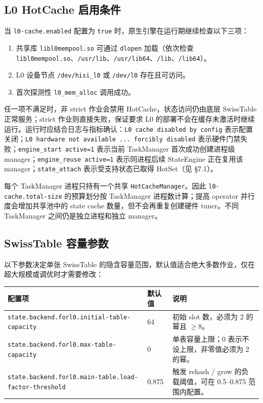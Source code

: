 \documentclass[a4paper,11pt]{article}
\newcommand{\cfg}[1]{\nolinkurl{#1}}
\begin{document}
\subsection{L0 HotCache 启用条件}

当 \texttt{l0-cache.enabled} 配置为 \texttt{true} 时，原生引擎在运行期继续检查以下三项：

\begin{enumerate}
  \item 共享库 \texttt{libl0mempool.so} 可通过 \texttt{dlopen} 加载（依次检查 \texttt{libl0mempool.so}、\texttt{/usr/lib}、\texttt{/usr/lib64}、\texttt{/lib}、\texttt{/lib64}）。
  \item L0 设备节点 \texttt{/dev/hisi\_l0} 或 \texttt{/dev/l0} 存在且可访问。
  \item 首次探测性 \texttt{l0\_mem\_alloc} 调用成功。
\end{enumerate}

任一项不满足时，非 strict 作业会禁用 HotCache，状态访问仍由底层 SwissTable 正常服务；strict 作业则直接失败，保证要求 L0 的部署不会在缓存未激活时继续运行。运行时应结合日志与指标确认：\texttt{L0 cache disabled by config} 表示配置关闭；\texttt{L0 hardware not available ... forcibly disabled} 表示硬件门禁失败；\texttt{engine\_start active=1} 表示当前 TaskManager 首次成功创建进程级 manager；\texttt{engine\_reuse active=1} 表示同进程后续 StateEngine 正在复用该 manager；\texttt{state\_attach} 表示受支持状态已取得 HotSet（见 \S7.1）。

每个 TaskManager 进程只持有一个共享 \texttt{HotCacheManager}。因此 \texttt{l0-cache.total-size} 的预算划分按 TaskManager 进程数计算；提高 operator 并行度会增加共享池中的 state cache 数量，但不会再重复创建硬件 tuner。不同 TaskManager 之间仍是独立进程和独立 manager。

\subsection{SwissTable 容量参数}

以下参数决定单张 SwissTable 的隐含容量范围，默认值适合绝大多数作业，仅在超大规模或调优时才需要修改：

\begin{table}[H]
\centering
\small
\begin{tabularx}{\textwidth}{L{6.0cm} L{2.0cm} X}
\toprule
\textbf{配置项} & \textbf{默认值} & \textbf{说明} \\
\midrule
\cfg{state.backend.forl0.initial-table-capacity} & 64 & 初始 slot 数，必须为 2 的幂且 $\ge 8$。 \\
\cfg{state.backend.forl0.max-table-capacity}     & 0 & 单表容量上限；0 表示不设上限，非零值必须为 2 的幂。 \\
\cfg{state.backend.forl0.main-table.load-factor-threshold} & 0.875 & 触发 rehash / grow 的负载阈值，可在 0.5--0.875 范围内配置。 \\
\bottomrule
\end{tabularx}
\end{table}
\end{document}
